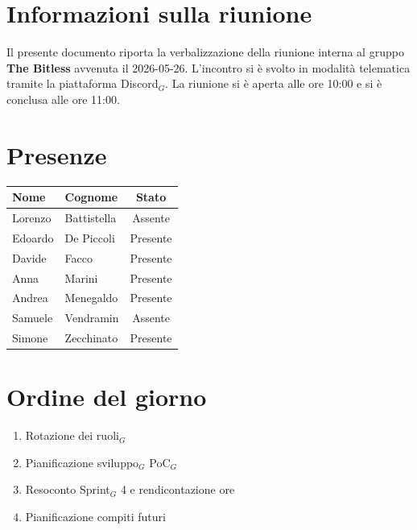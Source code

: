 \documentclass[a4paper, 10pt, colorlinks=true, linkcolor=black, urlcolor=blue, citecolor=blue, hidelinks]{article}
\begin{document}
\newcommand{\titolo}{interno}
\newcommand{\dataverbale}{2026-05-26}
\newcommand{\dataversione}{2026-05-28}
\newcommand{\versione}{1.0.0}
\newcommand{\stato}{Approvato}
\newcommand{\destinatari}{The Bitless, prof. Tullio Vardanega, prof. Riccardo Cardin}
\def\templatedir{../../../../templates}

\begin{titlepage}

\end{titlepage}

\newpage
\tableofcontents 

\newpage
{}
\section{Informazioni sulla riunione}
Il presente documento riporta la verbalizzazione della riunione interna al gruppo \textbf{The Bitless} avvenuta il \dataverbale{}. L'incontro si è svolto in modalità telematica tramite la piattaforma Discord$_G$. La riunione si è aperta alle ore 10:00 e si è conclusa alle ore 11:00.

\section{Presenze}
\begin{center}
\begin{tabular}{|l|l|c|}
\hline
\textbf{Nome} & \textbf{Cognome} & \textbf{Stato} \\
\hline
Lorenzo & Battistella & Assente \\
Edoardo & De Piccoli & Presente \\
Davide & Facco & Presente \\
Anna & Marini & Presente \\
Andrea & Menegaldo & Presente \\
Samuele & Vendramin & Assente \\
Simone & Zecchinato & Presente \\
\hline
\end{tabular}
\end{center}

\section{Ordine del giorno}
\begin{enumerate}
    \item Rotazione dei ruoli$_G$ 
    \item Pianificazione sviluppo$_G$ PoC$_G$
    \item Resoconto Sprint$_G$ 4 e rendicontazione ore
    \item Pianificazione compiti futuri
\end{enumerate}
\end{document}
